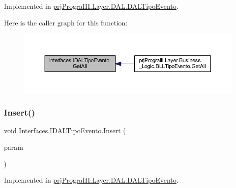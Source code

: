 Implemented in \hyperlink{classprj_progra_i_i_i_1_1_layer_1_1_d_a_l_1_1_d_a_l_tipo_evento_afc72a91b1a8484b317932a6f01c42815}{prj\+Progra\+I\+I\+I.\+Layer.\+D\+A\+L.\+D\+A\+L\+Tipo\+Evento}.

Here is the caller graph for this function\+:
\nopagebreak
\begin{figure}[H]
\begin{center}
\leavevmode
\includegraphics[width=350pt]{interface_interfaces_1_1_i_d_a_l_tipo_evento_a8e2c880d0b06a4ed517fddda2fba826b_icgraph}
\end{center}
\end{figure}
\hypertarget{interface_interfaces_1_1_i_d_a_l_tipo_evento_ac9cd8048199f2db94302ae677629a531}{}\label{interface_interfaces_1_1_i_d_a_l_tipo_evento_ac9cd8048199f2db94302ae677629a531} 
\subsubsection{\texorpdfstring{Insert()}{Insert()}}
{\footnotesize\ttfamily void Interfaces.\+I\+D\+A\+L\+Tipo\+Evento.\+Insert (\begin{DoxyParamCaption}\item[{\hyperlink{classprj_progra_i_i_i_1_1_layer_1_1_entities_1_1_tipo_evento}{Tipo\+Evento}}]{param }\end{DoxyParamCaption})}



Implemented in \hyperlink{classprj_progra_i_i_i_1_1_layer_1_1_d_a_l_1_1_d_a_l_tipo_evento_a890327fb7a414d8f67033f6036227418}{prj\+Progra\+I\+I\+I.\+Layer.\+D\+A\+L.\+D\+A\+L\+Tipo\+Evento}.

